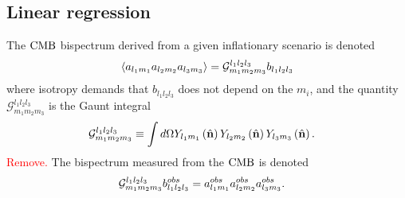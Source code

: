     \subsection{Linear regression}
    The $\text{CMB}$ bispectrum derived from a given inflationary scenario is denoted
    \begin{align}
        \left<a_{l_1m_1}a_{l_2m_2}a_{l_3m_3}\right> = \mathcal{G}^{l_1l_2l_3}_{m_1m_2m_3}b_{l_1l_2l_3}
    \end{align}
    where isotropy demands that $b_{l_1l_2l_3}$ does not depend on the $m_i$,
    and the quantity $\mathcal{G}^{l_1l_2l_3}_{m_1m_2m_3}$ is the Gaunt integral
    \begin{align}
        \mathcal{G}^{l_1l_2l_3}_{m_1m_2m_3} &\equiv \int d\Omega Y_{l_1m_1}\nhatbrkt Y_{l_2m_2}\nhatbrkt Y_{l_3m_3}\nhatbrkt. %
    \end{align}
    \textcolor{red}{Remove.}
    The bispectrum measured from the $\text{CMB}$ is denoted
    \begin{align}
        \mathcal{G}^{l_1l_2l_3}_{m_1m_2m_3}b^{obs}_{l_1l_2l_3} &= a^{obs}_{l_1m_1}a^{obs}_{l_2m_2}a^{obs}_{l_3m_3}.
    \end{align}


